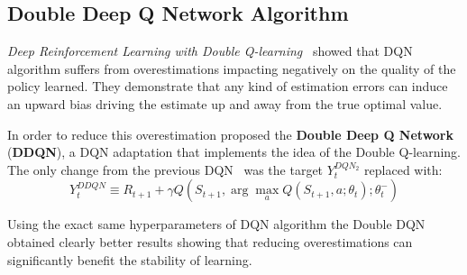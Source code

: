 \subsection{Double Deep Q Network Algorithm}

\textit{Deep Reinforcement Learning with Double Q-learning}~\cite{Hasselt:2016:DRL:3016100.3016191} showed that DQN algorithm suffers from overestimations impacting negatively on the quality of the policy learned. They demonstrate that any kind of estimation errors can induce an upward bias driving the estimate up and away from the true optimal value.

In order to reduce this overestimation \citeauthor{Hasselt:2016:DRL:3016100.3016191}  proposed the \textbf{Double Deep Q Network} (\textbf{DDQN}), a DQN adaptation that implements the idea of the Double Q-learning. The only change from the previous DQN~\cite{Mnih2015} was the target $Y_t^{DQN_2}$ replaced with:
\begin{equation}
	Y^{DDQN}_t \equiv R_{t+1} + \gamma Q(S_{t+1}, 
		\arg\max_{a} Q(S_{t+1}, a; \theta_t); \theta_t^-)
\end{equation}

Using the exact same hyperparameters of DQN algorithm the Double DQN obtained clearly better results showing that reducing overestimations can significantly benefit the stability of learning.


